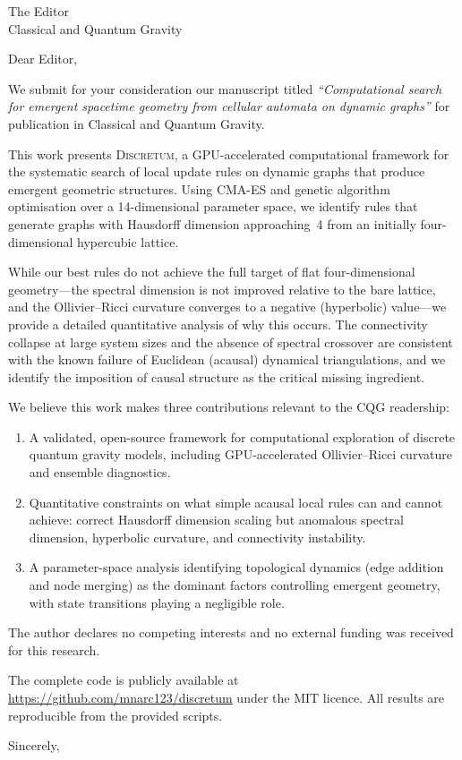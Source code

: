 \documentclass[11pt]{letter}
\begin{document}
\begin{letter}{The Editor\\Classical and Quantum Gravity}

\opening{Dear Editor,}

We submit for your consideration our manuscript titled
\emph{``Computational search for emergent spacetime geometry from
cellular automata on dynamic graphs''} for publication in
Classical and Quantum Gravity.

This work presents \textsc{Discretum}, a GPU-accelerated computational
framework for the systematic search of local update rules on dynamic
graphs that produce emergent geometric structures.  Using CMA-ES and
genetic algorithm optimisation over a 14-dimensional parameter space,
we identify rules that generate graphs with Hausdorff dimension
approaching~4 from an initially four-dimensional hypercubic lattice.

While our best rules do not achieve the full target of flat
four-dimensional geometry---the spectral dimension is not improved
relative to the bare lattice, and the Ollivier--Ricci curvature
converges to a negative (hyperbolic) value---we provide a detailed
quantitative analysis of why this occurs.  The connectivity collapse
at large system sizes and the absence of spectral crossover are
consistent with the known failure of Euclidean (acausal) dynamical
triangulations, and we identify the imposition of causal structure as
the critical missing ingredient.

We believe this work makes three contributions relevant to the CQG
readership:
\begin{enumerate}
\item A validated, open-source framework for computational exploration
  of discrete quantum gravity models, including GPU-accelerated
  Ollivier--Ricci curvature and ensemble diagnostics.
\item Quantitative constraints on what simple acausal local rules can
  and cannot achieve: correct Hausdorff dimension scaling but anomalous
  spectral dimension, hyperbolic curvature, and connectivity
  instability.
\item A parameter-space analysis identifying topological dynamics
  (edge addition and node merging) as the dominant factors controlling
  emergent geometry, with state transitions playing a negligible role.
\end{enumerate}

The author declares no competing interests and no external
funding was received for this research.

The complete code is publicly available at
\url{https://github.com/mnarc123/discretum} under the MIT
licence.  All results are reproducible from the provided scripts.

\closing{Sincerely,}

\end{letter}
\end{document}
